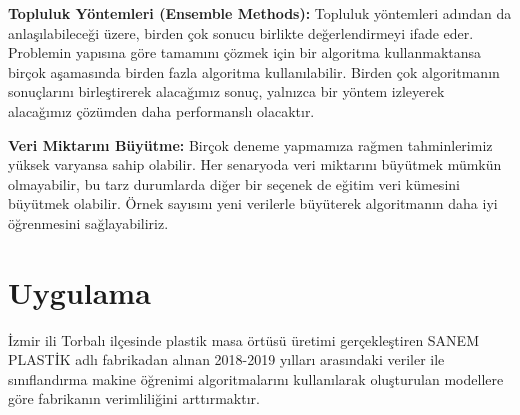 \documentclass[12pt,twoside]{deuthesis}
\begin{document}
\textbf{Topluluk Yöntemleri (Ensemble Methods):} Topluluk yöntemleri adından da anlaşılabileceği üzere, birden çok sonucu birlikte değerlendirmeyi ifade eder. Problemin yapısına göre tamamını çözmek için bir algoritma kullanmaktansa birçok aşamasında birden fazla algoritma kullanılabilir. Birden çok algoritmanın sonuçlarını birleştirerek alacağımız sonuç, yalnızca bir yöntem izleyerek alacağımız çözümden daha performanslı olacaktır.

\textbf{Veri Miktarını Büyütme:} Birçok deneme yapmamıza rağmen tahminlerimiz yüksek varyansa sahip olabilir. Her senaryoda veri miktarını büyütmek mümkün olmayabilir, bu tarz durumlarda diğer bir seçenek de eğitim veri kümesini büyütmek olabilir. Örnek sayısını yeni verilerle büyüterek algoritmanın daha iyi öğrenmesini sağlayabiliriz.

\hypertarget{Bolum4}{%
\chapter{Uygulama}\label{Bolum4}}

İzmir ili Torbalı ilçesinde plastik masa örtüsü üretimi gerçekleştiren SANEM PLASTİK adlı fabrikadan alınan 2018-2019 yılları arasındaki veriler ile sınıflandırma makine öğrenimi algoritmalarını kullanılarak oluşturulan modellere göre fabrikanın verimliliğini arttırmaktır.

~
\end{document}
